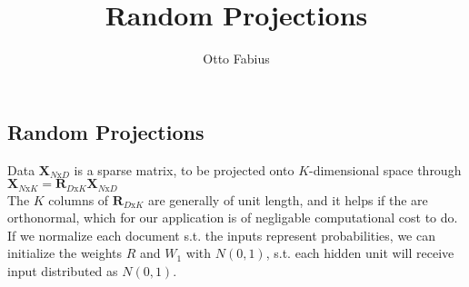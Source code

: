 \documentclass{article}
\author{Otto Fabius}
\title{Random Projections}
\begin{document}
\maketitle

\subsection{Random Projections}

Data $\mathbf{X}_{N\text{x}D}$ is a sparse matrix, to be projected onto $K$-dimensional space through $\mathbf{X}_{N\text{x}K} = \mathbf{R}_{D\text{x}K}\mathbf{X}_{N\text{x}D}$
\\
The $K$ columns of $\mathbf{R}_{D\text{x}K}$ are generally of unit length, and it helps if the are orthonormal, which for our application is of negligable computational cost to do. If we normalize each document s.t. the inputs represent probabilities, we can initialize the weights $R$ and $W_1$ with $N(0,1)$, s.t. each hidden unit will receive input distributed as $N(0,1)$. 
\end{document}
